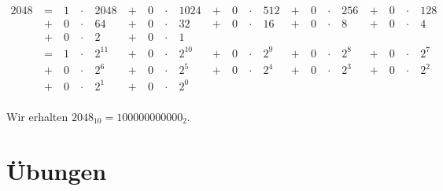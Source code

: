 \begin{example}

\begin{align*}
2048 & ~ = ~ & 1 & ~\cdot~ & 2048  & ~ + ~ & 0 & ~\cdot~ & 1024 & ~ + ~ & 0 & ~\cdot~ & 512 & ~ + ~ & 0 & ~\cdot~ & 256 & ~ + ~ & 0 & ~\cdot~ & 128 \\ 
& ~ + ~ & 0 & ~\cdot~ & 64 & ~ + ~ & 0 & ~\cdot~ & 32 & ~ + ~ & 0 & ~\cdot~ & 16 & ~ + ~ & 0 & ~\cdot~ & 8 & ~ + ~ & 0 & ~\cdot~ & 4 \\
& ~ + ~ & 0 & ~\cdot~ & 2 & ~ + ~ & 0 & ~\cdot~ & 1  \\
& ~ = ~ & 1 & ~\cdot~ & 2^{11}  & ~ + ~ & 0 & ~\cdot~ & 2^{10}  & ~ + ~ & 0 & ~\cdot~ & 2^9 & ~ + ~ & 0 & ~\cdot~ & 2^8 & ~ + ~ & 0 & ~\cdot~ & 2^7 \\ 
& ~ + ~ & 0 & ~\cdot~ & 2^6 & ~ + ~ & 0 & ~\cdot~ & 2^5 & ~ + ~ & 0 & ~\cdot~ & 2^4 & ~ + ~ & 0 & ~\cdot~ & 2^3 & ~ + ~ & 0 & ~\cdot~ & 2^2 \\ 
& ~ + ~ & 0 & ~\cdot~ & 2^1 & ~ + ~ & 0 & ~\cdot~ & 2^0  \\
\end{align*}

Wir erhalten $2048_{10} = 100000000000_2$.

\end{example}

\newpage

\section{Übungen}

